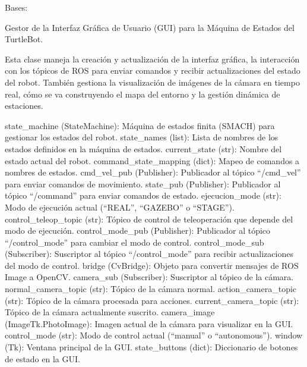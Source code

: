 \documentclass[a4paper,10pt,spanish]{sphinxmanual}
\begin{document}
\begin{fulllineitems}
\label{\detokenize{squad_state_manager:squad_interfaz.InterfazManager}}
\pysigstartsignatures
{}
\pysigstopsignatures
\sphinxAtStartPar
Bases: 

\sphinxAtStartPar
Gestor de la Interfaz Gráfica de Usuario (GUI) para la Máquina de Estados del TurtleBot.

\sphinxAtStartPar
Esta clase maneja la creación y actualización de la interfaz gráfica, la interacción con
los tópicos de ROS para enviar comandos y recibir actualizaciones del estado del robot.
También gestiona la visualización de imágenes de la cámara en tiempo real, cómo se va construyendo el mapa del entorno y la gestión dinámica
de estaciones.
\begin{description}
\sphinxAtStartPar
state\_machine (StateMachine): Máquina de estados finita (SMACH) para gestionar los estados del robot.
state\_names (list): Lista de nombres de los estados definidos en la máquina de estados.
current\_state (str): Nombre del estado actual del robot.
command\_state\_mapping (dict): Mapeo de comandos a nombres de estados.
cmd\_vel\_pub (Publisher): Publicador al tópico “/cmd\_vel” para enviar comandos de movimiento.
state\_pub (Publisher): Publicador al tópico “/command” para enviar comandos de estado.
ejecucion\_mode (str): Modo de ejecución actual (“REAL”, “GAZEBO” o “STAGE”).
control\_teleop\_topic (str): Tópico de control de teleoperación que depende del modo de ejecución.
control\_mode\_pub (Publisher): Publicador al tópico “/control\_mode” para cambiar el modo de control.
control\_mode\_sub (Subscriber): Suscriptor al tópico “/control\_mode” para recibir actualizaciones del modo de control.
bridge (CvBridge): Objeto para convertir mensajes de ROS Image a OpenCV.
camera\_sub (Subscriber): Suscriptor al tópico de la cámara.
normal\_camera\_topic (str): Tópico de la cámara normal.
action\_camera\_topic (str): Tópico de la cámara procesada para acciones.
current\_camera\_topic (str): Tópico de la cámara actualmente suscrito.
camera\_image (ImageTk.PhotoImage): Imagen actual de la cámara para visualizar en la GUI.
control\_mode (str): Modo de control actual (“manual” o “autonomous”).
window (Tk): Ventana principal de la GUI.
state\_buttons (dict): Diccionario de botones de estado en la GUI.

\end{description}
\end{fulllineitems}
\end{document}
